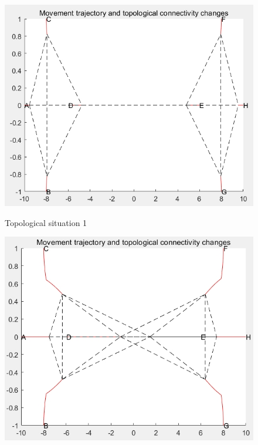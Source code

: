 \documentclass[12pt]{ctexart}
\begin{document}
\begin{figure}[h]
	
	\begin{minipage}{0.32\linewidth}
		\vspace{3pt}
		\centerline{\includegraphics[width=\textwidth]{Image/type1.png}}
		\centerline{Topological situation 1}
	\end{minipage}
	\begin{minipage}{0.315\linewidth}
		\vspace{3pt}
		\centerline{\includegraphics[width=\textwidth]{Image/type2.png}}
	 

\end{minipage}
\end{figure}
\end{document}
